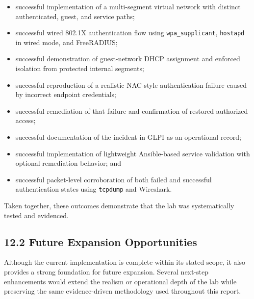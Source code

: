 \documentclass[11pt]{article}
\begin{document}
\begin{itemize}
    \item successful implementation of a multi-segment virtual network with distinct authenticated, guest, and service paths;
    \item successful wired 802.1X authentication flow using \texttt{wpa\_supplicant}, \texttt{hostapd} in wired mode, and FreeRADIUS;
    \item successful demonstration of guest-network DHCP assignment and enforced isolation from protected internal segments;
    \item successful reproduction of a realistic NAC-style authentication failure caused by incorrect endpoint credentials;
    \item successful remediation of that failure and confirmation of restored authorized access;
    \item successful documentation of the incident in GLPI as an operational record;
    \item successful implementation of lightweight Ansible-based service validation with optional remediation behavior; and
    \item successful packet-level corroboration of both failed and successful authentication states using \texttt{tcpdump} and Wireshark.
\end{itemize}

Taken together, these outcomes demonstrate that the lab was systematically tested and evidenced.


\subsection{12.2 Future Expansion Opportunities}
\label{sec:future-expansion-opportunities}

Although the current implementation is complete within its stated scope, it also provides a strong foundation for future expansion. Several next-step enhancements would extend the realism or operational depth of the lab while preserving the same evidence-driven methodology used throughout this report.
\end{document}
